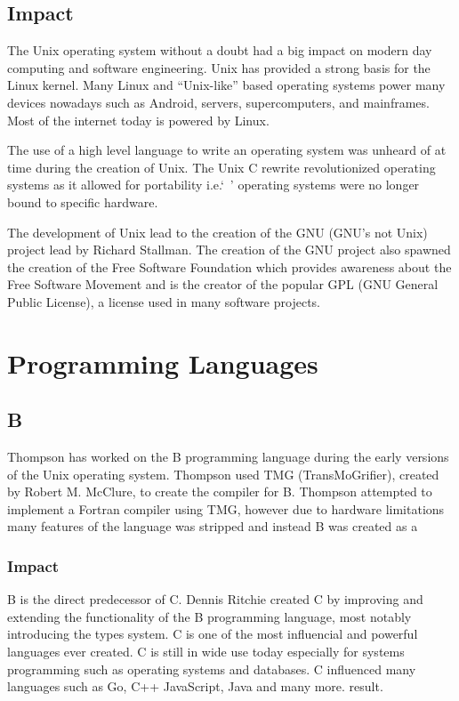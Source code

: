 \documentclass{article}
\begin{document}
\subsection{Impact}
The Unix operating system without a doubt had a big impact on modern day
computing and software engineering. Unix has provided a strong basis for the
Linux kernel. Many Linux and ``Unix-like'' based operating systems power many
devices nowadays such as Android, servers, supercomputers, and mainframes. Most
of the internet today is powered by Linux.

The use of a high level language to write an operating system was unheard of at
time during the creation of Unix. The Unix C rewrite revolutionized operating
systems as it allowed for portability i.e.`\ ' operating systems were no longer
bound to specific hardware.

The development of Unix lead to the creation of the GNU (GNU's not Unix)
project lead by Richard Stallman. The creation of the GNU project also spawned
the creation of the Free Software Foundation which provides awareness about the
Free Software Movement and is the creator of the popular GPL (GNU General
Public License), a license used in many software projects.

\section{Programming Languages}
\subsection{B}
Thompson has worked on the B programming language during the early versions of
the Unix operating system. Thompson used TMG (TransMoGrifier), created by
Robert M. McClure, to create the compiler for B.  Thompson attempted to
implement a Fortran compiler using TMG, however due to hardware limitations
many features of the language was stripped and instead B was created as a

\subsubsection{Impact}
B is the direct predecessor of C. Dennis Ritchie created C by improving and
extending the functionality of the B programming language, most notably
introducing the types system. C is one of the most influencial and powerful
languages ever created. C is still in wide use today especially for systems
programming such as operating systems and databases. C influenced many
languages such as Go, C++ JavaScript, Java and many more.
result.\cite{VCF}
\end{document}
